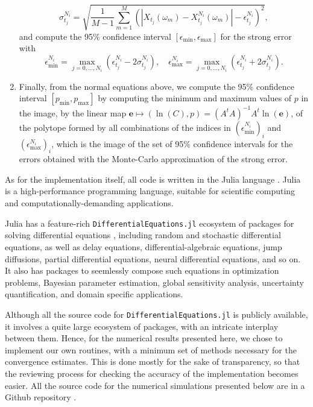 \documentclass[reqno,12pt]{amsart}
\theoremstyle{plain} %
\theoremstyle{definition} %
\begin{document}
\begin{enumerate}
    \[
        \sigma_{t_j}^{N_i} = \sqrt{\frac{1}{M-1}\sum_{m=1}^M \left(\left|X_{t_j}(\omega_m) - X_{t_j}^{N_i}(\omega_m) \right|- \epsilon_{t_j}^{N_i}\right)^2},
    \]
    and compute the 95\% confidence interval $[\epsilon_{\min}, \epsilon_{\max}]$ for the strong error with
    \[
        \epsilon_{\min}^{N_i} = \max_{j=0, \ldots, N_i} (\epsilon_{t_j}^{N_i} - 2\sigma_{t_j}^{N_i}), \quad \epsilon_{\max}^{N_i} = \max_{j=0, \ldots, N_i} (\epsilon_{t_j}^{N_i} + 2\sigma_{t_j}^{N_i}).
    \]
    \item Finally, from the normal equations above, we compute the 95\% confidence interval $[p_{\min}, p_{\max}]$ by computing the minimum and maximum values of $p$ in the image, by the linear map $\mathbf{e} \mapsto (\ln(C), p) = (A^tA)^{-1}A^t\ln(\mathbf{e})$, of the polytope formed by all combinations of the indices in $(\epsilon_{\min}^{N_i})_i$ and $(\epsilon_{\max}^{N_i})_i$, which is the image of the set of 95\% confidence intervals for the errors obtained with the Monte-Carlo approximation of the strong error.
\end{enumerate}

As for the implementation itself, all code is written in the Julia language \cite{Julia2017}. Julia is a high-performance programming language, suitable for scientific computing and computationally-demanding applications.

Julia has a feature-rich \texttt{DifferentialEquations.jl} ecosystem of packages for solving differential equations \cite{RackauckasNie2017}, including random and stochastic differential equations, as well as delay equations, differential-algebraic equations, jump diffusions, partial differential equations, neural differential equations, and so on. It also has packages to seemlessly compose such equations in optimization problems, Bayesian parameter estimation, global sensitivity analysis, uncertainty quantification, and domain specific applications.

Although all the source code for \texttt{DifferentialEquations.jl} is publicly available, it involves a quite large ecosystem of packages, with an intricate interplay between them. Hence, for the numerical results presented here, we chose to implement our own routines, with a minimum set of methods necessary for the convergence estimates. This is done mostly for the sake of transparency, so that the reviewing process for checking the accuracy of the implementation becomes easier. All the source code for the numerical simulations presented below are in a Github repository \cite{RODEConvEM2023}.
\end{document}
